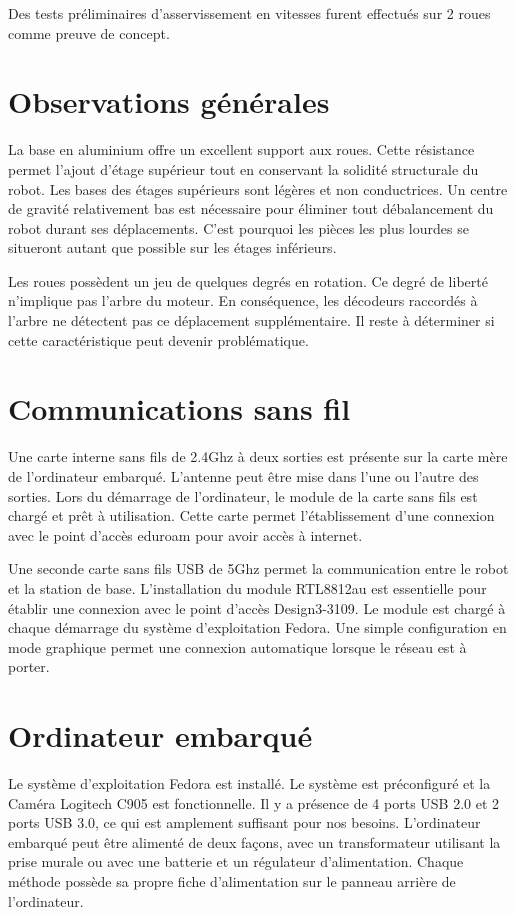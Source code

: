 Des tests préliminaires d'asservissement en vitesses furent effectués sur 2 roues comme preuve de concept. 

\section{Observations générales}
  La base en aluminium offre un excellent support aux roues. Cette résistance permet l’ajout d’étage supérieur tout en conservant la solidité structurale du robot. Les bases des étages supérieurs sont légères et non conductrices. Un centre de gravité relativement bas est nécessaire pour éliminer tout débalancement du robot durant ses déplacements. C’est pourquoi les pièces les plus lourdes se situeront autant que possible sur les étages inférieurs.

Les roues possèdent un jeu de quelques degrés en rotation. Ce degré de liberté n’implique pas l’arbre du moteur. En conséquence, les décodeurs raccordés à l’arbre ne détectent pas ce déplacement supplémentaire. Il reste à déterminer si cette caractéristique peut devenir problématique. 


\section{Communications sans fil}
 Une carte interne sans fils de 2.4Ghz à deux sorties est présente sur la carte mère de l’ordinateur embarqué. L’antenne peut être mise dans l’une ou l’autre des sorties. Lors du démarrage de l’ordinateur, le module de la carte sans fils est chargé et prêt à utilisation. Cette carte permet l’établissement d’une connexion avec le point d’accès eduroam pour avoir accès à internet. 
 
 Une seconde carte sans fils USB de 5Ghz permet la communication entre le robot et la station de base. L’installation du module RTL8812au est essentielle pour établir une connexion avec le point d’accès Design3-3109. Le module est chargé à chaque démarrage du système d’exploitation Fedora. Une simple configuration en mode graphique permet une connexion automatique lorsque le réseau est à porter. 

\section{Ordinateur embarqué}
 Le système d’exploitation Fedora est installé. Le système est préconfiguré et la Caméra Logitech C905 est fonctionnelle.  Il y a présence de 4 ports USB 2.0 et 2 ports USB 3.0, ce qui est amplement suffisant pour nos besoins. L’ordinateur embarqué peut être alimenté de deux façons, avec un transformateur utilisant la prise murale ou avec une batterie et un régulateur d’alimentation. Chaque méthode possède sa propre fiche d’alimentation sur le panneau arrière de l’ordinateur. 


